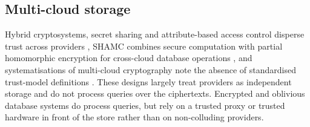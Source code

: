\documentclass[a4paper,fleqn]{cas-sc}
\begin{document}
\subsection{Multi-cloud storage}
Hybrid cryptosystems, secret sharing and attribute-based access control
disperse trust across providers
\citep{bharot2025cloudlock,muthuvel2026design}, SHAMC combines secure
computation with partial homomorphic encryption for cross-cloud database
operations \citep{wang2020shamc}, and systematisations of multi-cloud
cryptography note the absence of standardised trust-model definitions
\citep{cryptoeprint:2026/207}. These designs largely treat providers as
independent storage and do not process queries over the ciphertexts.
Encrypted and oblivious database systems
\citep{poddar2019arx,crooks2018obladi,dauterman2021snoopy} do process queries,
but rely on a trusted proxy or trusted hardware in front of the store rather
than on non-colluding providers.
\end{document}
